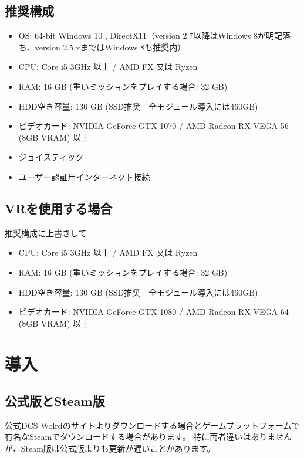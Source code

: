 \subsection{推奨構成}
\begin{itemize}
  \item OS: 64-bit Windows 10 , DirectX11（version 2.7以降はWindows 8が明記落ち、version 2.5.xまではWindows 8も推奨内）
  \item CPU: Core i5 3GHz 以上 / AMD FX 又は Ryzen
  \item RAM: 16 GB (重いミッションをプレイする場合: 32 GB)
  \item HDD空き容量: 130 GB (SSD推奨　全モジュール導入には460GB)
  \item ビデオカード: NVIDIA GeForce GTX 1070 / AMD Radeon RX VEGA 56 (8GB VRAM) 以上
  \item ジョイスティック
  \item ユーザー認証用インターネット接続
\end{itemize}

\subsection{VRを使用する場合}
推奨構成に上書きして
\begin{itemize}
  \item CPU: Core i5 3GHz 以上 / AMD FX 又は Ryzen
  \item RAM: 16 GB (重いミッションをプレイする場合: 32 GB)
  \item HDD空き容量: 130 GB (SSD推奨　全モジュール導入には460GB)
  \item ビデオカード: NVIDIA GeForce GTX 1080 / AMD Radeon RX VEGA 64 (8GB VRAM) 以上
\end{itemize}

\section{導入}
\subsection{公式版とSteam版}
公式DCS Wolrdのサイトよりダウンロードする場合とゲームプラットフォームで有名なSteamでダウンロードする場合があります。
特に両者違いはありませんが、Steam版は公式版よりも更新が遅いことがあります。

